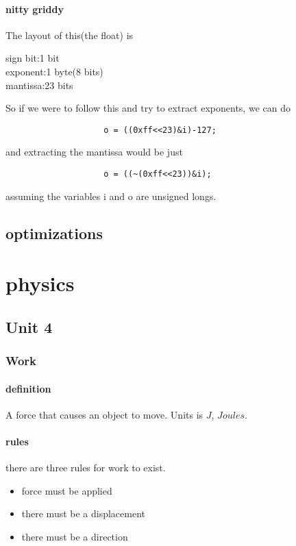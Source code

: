 \documentclass{article} %
\begin{document}
            \paragraph{nitty griddy}
                The layout of this(the float) is 
                \begin{center}
                    sign bit:1 bit\\
                    exponent:1 byte(8 bits)\\
                    mantissa:23 bits\\
                \end{center}
                So if we were to follow this and try to extract exponents, we can do
                \begin{verbatim}
                    o = ((0xff<<23)&i)-127;
                \end{verbatim}
                and extracting the mantissa would be just 
                \begin{verbatim}
                    o = ((~(0xff<<23))&i);
                \end{verbatim}
                assuming the variables i and o are unsigned longs.
    \subsection{optimizations}
\section{physics}
    \subsection{Unit 4}
        \subsubsection{Work}
            \paragraph{definition}
                A force that causes an object to move. Units is $J$, $Joules$.
            \paragraph{rules}
                there are three rules for work to exist.
                \begin{itemize}
                    \item force must be applied
                    \item there must be a displacement
                    \item there must be a direction
                \end{itemize}
\end{document}

